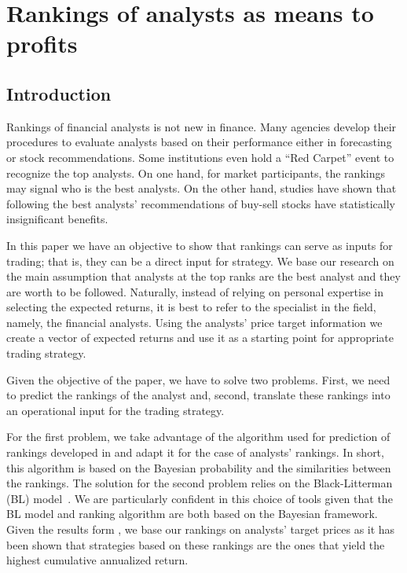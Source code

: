 \documentclass[a4paper,12pt,openright,notitlepage]{report}\usepackage[]{graphicx}\usepackage[]{color}
\begin{document}
\chapter{Rankings of analysts as means to profits}
\label{ch4}
\begin{abstract}

\end{abstract}








\section{Introduction}
\label{ch4-sec:introduction}


Rankings of financial analysts is not new in finance. Many agencies develop their procedures to evaluate analysts based on their performance either in forecasting or stock recommendations. Some institutions even hold a ``Red Carpet'' event to recognize the top analysts. On one hand, for market participants, the rankings may signal who is the best analysts. On the other hand, studies have shown that following the best analysts' recommendations of buy-sell stocks have statistically insignificant benefits.

In this paper we have an objective to show that rankings can serve as inputs for trading; that is, they can be a direct input for strategy. We base our research on the main assumption that analysts at the top ranks are the best analyst and they are worth to be followed. Naturally, instead of relying on personal expertise in selecting the expected returns, it is best to refer to the specialist in the field, namely, the financial analysts. Using the analysts' price target information we  create a vector of expected returns and use it as a starting point for appropriate trading strategy.

Given the objective of the paper, we have to solve two problems. First, we need to predict the rankings of the analyst and, second, translate these rankings into an operational input for the trading strategy.

For the first problem, we take advantage of the algorithm used for prediction of rankings developed in \cite{aiguzhinov2010} and adapt it for the case of analysts' rankings. In short, this algorithm is based on the Bayesian probability and the similarities between the rankings.
The solution for the second problem relies on the Black-Litterman (BL) model~\citep{black1992}. We are particularly confident in this choice of tools given that the BL model and ranking algorithm are both based on the Bayesian framework. Given the results form \cite{aiguzhinov2015a}, we base our rankings on analysts' target prices as it has been shown that strategies based on these rankings are the ones that yield the highest cumulative annualized return.
\end{document}
